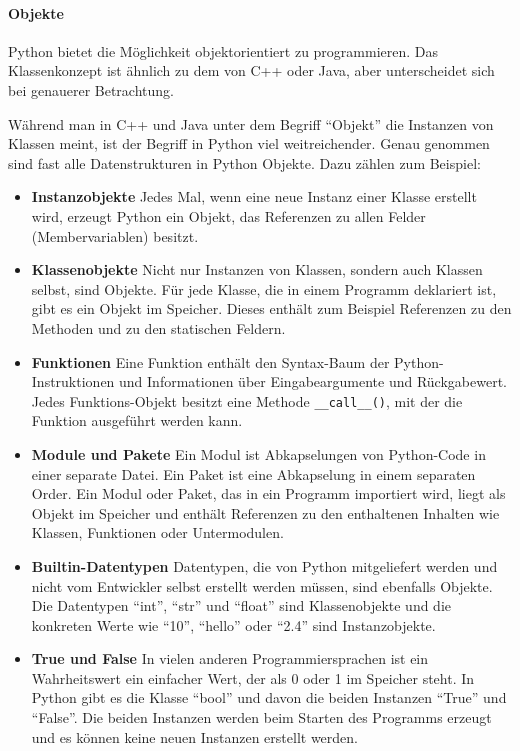 
			
		
		\paragraph{Objekte} Python bietet die Möglichkeit objektorientiert zu programmieren. Das Klassenkonzept ist ähnlich zu dem von C++ oder Java, aber unterscheidet sich bei genauerer Betrachtung.
		
		Während man in C++ und Java unter dem Begriff "`Objekt"' die Instanzen von Klassen meint, ist der Begriff in Python viel weitreichender. Genau genommen sind fast alle Datenstrukturen in Python Objekte. Dazu zählen zum Beispiel:
		\begin{itemize}
			\item \textbf{Instanzobjekte} Jedes Mal, wenn eine neue Instanz einer Klasse erstellt wird, erzeugt Python ein Objekt, das Referenzen zu allen Felder (Membervariablen) besitzt. 			
			\item \textbf{Klassenobjekte} Nicht nur Instanzen von Klassen, sondern auch Klassen selbst, sind Objekte. Für jede Klasse, die in einem Programm deklariert ist, gibt es ein Objekt im Speicher. Dieses enthält zum Beispiel Referenzen zu den Methoden und zu den statischen Feldern.
			\item \textbf{Funktionen} Eine Funktion enthält den Syntax-Baum der Python-Instruktionen und Informationen über Eingabeargumente und Rückgabewert. Jedes Funktions-Objekt besitzt eine Methode \lstinline|__call__()|, mit der die Funktion ausgeführt werden kann.
			\item \textbf{Module und Pakete} Ein Modul ist Abkapselungen von Python-Code in einer separate Datei. Ein Paket ist eine Abkapselung in einem separaten Order. Ein Modul oder Paket, das in ein Programm importiert wird, liegt als Objekt im Speicher und enthält Referenzen zu den enthaltenen Inhalten wie Klassen, Funktionen oder Untermodulen.
			\item \textbf{Builtin-Datentypen} Datentypen, die von Python mitgeliefert werden und nicht vom Entwickler selbst erstellt werden müssen, sind ebenfalls Objekte. Die Datentypen "`int"', "`str"' und "`float"' sind Klassenobjekte und die konkreten Werte wie "`10"', "`hello"' oder "`2.4"' sind Instanzobjekte.
			\item \textbf{True und False} In vielen anderen Programmiersprachen ist ein Wahrheitswert ein einfacher Wert, der als 0 oder 1 im Speicher steht. In Python gibt es die Klasse "`bool"' und davon die beiden Instanzen "`True"' und "`False"'. Die beiden Instanzen werden beim Starten des Programms erzeugt und es können keine neuen Instanzen erstellt werden.
		\end{itemize}
